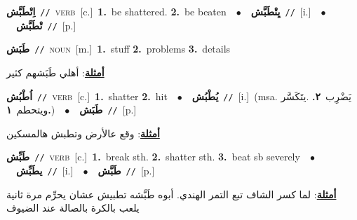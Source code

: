 \documentclass[10pt,a4paper,twoside]{article} %
\begin{document}
\begin{multicols}{2}
{{{{{{{{{{{{\setlength\topsep{0pt}\textbf{\foreignlanguage{arabic}{اِتْطَبَّش}}\ {\color{gray}\texttt{//}\color{black}}\ \textsc{verb}\ [c.]\ \textbf{1.}~be shattered.  \textbf{2.}~be beaten\ \ $\bullet$\ \ \setlength\topsep{0pt}\textbf{\foreignlanguage{arabic}{يِتْطَبَّش}}\ {\color{gray}\texttt{//}\color{black}}\ [i.]\ \ $\bullet$\ \ \setlength\topsep{0pt}\textbf{\foreignlanguage{arabic}{تْطَبَّش}}\ {\color{gray}\texttt{//}\color{black}}\ [p.]\ 

{\setlength\topsep{0pt}\textbf{\foreignlanguage{arabic}{طَبَش}}\ {\color{gray}\texttt{//}\color{black}}\ \textsc{noun}\ [m.]\ \textbf{1.}~stuff  \textbf{2.}~problems  \textbf{3.}~details\  \begin{flushright}\color{gray}\foreignlanguage{arabic}{\textbf{\underline{\foreignlanguage{arabic}{أمثلة}}}: أهلي طَبَشهم كثير}\end{flushright}\color{black}} \vspace{2mm}

{\setlength\topsep{0pt}\textbf{\foreignlanguage{arabic}{اُطْبُش}}\ {\color{gray}\texttt{//}\color{black}}\ \textsc{verb}\ [c.]\ \textbf{1.}~shatter  \textbf{2.}~hit\ \ $\bullet$\ \ \setlength\topsep{0pt}\textbf{\foreignlanguage{arabic}{يُطْبُش}}\ {\color{gray}\texttt{//}\color{black}}\ [i.]\ \color{gray}(msa. \foreignlanguage{arabic}{يَضْرِب}~\foreignlanguage{arabic}{\textbf{٢.}}  .\foreignlanguage{arabic}{يتَكَسَّر ويتحطم}~\foreignlanguage{arabic}{\textbf{١.}})\color{black}\ \ $\bullet$\ \ \setlength\topsep{0pt}\textbf{\foreignlanguage{arabic}{طَبَش}}\ {\color{gray}\texttt{//}\color{black}}\ [p.]\  \begin{flushright}\color{gray}\foreignlanguage{arabic}{\textbf{\underline{\foreignlanguage{arabic}{أمثلة}}}: وقع عالأرض وتطبش هالمسكين}\end{flushright}\color{black}} \vspace{2mm}

{\setlength\topsep{0pt}\textbf{\foreignlanguage{arabic}{طَبِّش}}\ {\color{gray}\texttt{//}\color{black}}\ \textsc{verb}\ [c.]\ \textbf{1.}~break sth.  \textbf{2.}~shatter sth.  \textbf{3.}~beat sb severely\ \ $\bullet$\ \ \setlength\topsep{0pt}\textbf{\foreignlanguage{arabic}{يطَبِّش}}\ {\color{gray}\texttt{//}\color{black}}\ [i.]\ \ $\bullet$\ \ \setlength\topsep{0pt}\textbf{\foreignlanguage{arabic}{طَبَّش}}\ {\color{gray}\texttt{//}\color{black}}\ [p.]\  \begin{flushright}\color{gray}\foreignlanguage{arabic}{\textbf{\underline{\foreignlanguage{arabic}{أمثلة}}}: لما كسر الشاف تبع التمر الهندي. أبوه طَبَّشه تطبيش عشان يحرِّم مرة ثانية يلعب بالكرة بالصالة عند الضيوف}\end{flushright}\color{black}} \vspace{2mm}

}}}}}}}}}}}}
\end{multicols}
\end{document}
